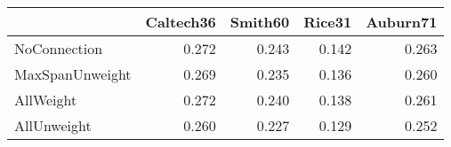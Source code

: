 \begin{tabular}{lrrrr}
\toprule
{} & Caltech36 & Smith60 & Rice31 & Auburn71 \\
\midrule
NoConnection    &     0.272 &   0.243 &  0.142 &    0.263 \\
MaxSpanUnweight &     0.269 &   0.235 &  0.136 &    0.260 \\
AllWeight       &     0.272 &   0.240 &  0.138 &    0.261 \\
AllUnweight     &     0.260 &   0.227 &  0.129 &    0.252 \\
\bottomrule
\end{tabular}
